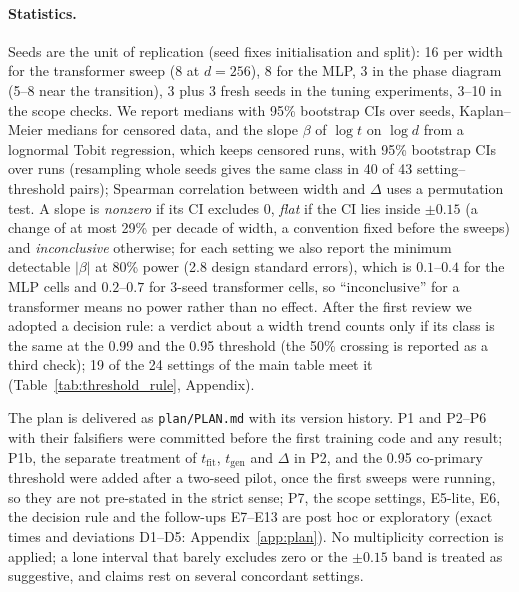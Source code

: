 \documentclass{article}
\begin{document}
\paragraph{Statistics.} Seeds are the unit of replication (seed fixes initialisation and split): 16 per width for the transformer sweep ($8$ at $d=256$), 8 for the MLP, 3 in the phase diagram (5--8 near the transition), 3 plus 3 fresh seeds in the tuning experiments, 3--10 in the scope checks. We report medians with 95\% bootstrap CIs over seeds, Kaplan--Meier medians for censored data, and the slope $\beta$ of $\log t$ on $\log d$ from a lognormal Tobit regression, which keeps censored runs, with 95\% bootstrap CIs over runs (resampling whole seeds gives the same class in 40 of 43 setting--threshold pairs); Spearman correlation between width and $\Delta$ uses a permutation test. A slope is \emph{nonzero} if its CI excludes 0, \emph{flat} if the CI lies inside $\pm0.15$ (a change of at most 29\% per decade of width, a convention fixed before the sweeps) and \emph{inconclusive} otherwise; for each setting we also report the minimum detectable $|\beta|$ at 80\% power (2.8 design standard errors), which is $0.1$--$0.4$ for the MLP cells and $0.2$--$0.7$ for 3-seed transformer cells, so ``inconclusive'' for a transformer means no power rather than no effect. After the first review we adopted a decision rule: a verdict about a width trend counts only if its class is the same at the 0.99 and the 0.95 threshold (the 50\% crossing is reported as a third check); 19 of the 24 settings of the main table meet it (Table~\ref{tab:threshold_rule}, Appendix).

The plan is delivered as \texttt{plan/PLAN.md} with its version history. P1 and P2--P6 with their falsifiers were committed before the first training code and any result; P1b, the separate treatment of $t_{\mathrm{fit}}$, $t_{\mathrm{gen}}$ and $\Delta$ in P2, and the 0.95 co-primary threshold were added after a two-seed pilot, once the first sweeps were running, so they are not pre-stated in the strict sense; P7, the scope settings, E5-lite, E6, the decision rule and the follow-ups E7--E13 are post hoc or exploratory (exact times and deviations D1--D5: Appendix~\ref{app:plan}). No multiplicity correction is applied; a lone interval that barely excludes zero or the $\pm0.15$ band is treated as suggestive, and claims rest on several concordant settings.
\end{document}
